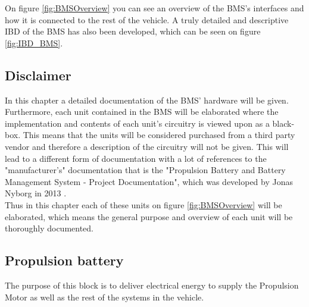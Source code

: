 On figure \vref{fig:BMSOverview} you can see an overview of the BMS's interfaces and how it is connected to the rest of the vehicle. A truly detailed and descriptive IBD of the BMS has also been developed, which can be seen on figure \vref{fig:IBD_BMS}.

\subsection{Disclaimer}
In this chapter a detailed documentation of the BMS' hardware will be given. Furthermore, each unit contained in the BMS will be elaborated where the implementation and contents of each unit's circuitry is viewed upon as a black-box. This means that the units will be considered purchased from a third party vendor and therefore a  description of the circuitry will not be given. This will lead to a different form of documentation with a lot of references to the "manufacturer's" documentation that is the "Propulsion Battery and Battery Management System - Project Documentation", which was developed by Jonas Nyborg in 2013 \cite{BMSDocumentation}.\\
Thus in this chapter each of these units on figure \vref{fig:BMSOverview} will be elaborated, which means the general purpose and overview of each unit will be thoroughly documented. 

\subsection{Propulsion battery}
\label{sec:BMSBattery}
The purpose of this block is to deliver electrical energy to supply the Propulsion Motor as well as the rest of the systems in the vehicle.

